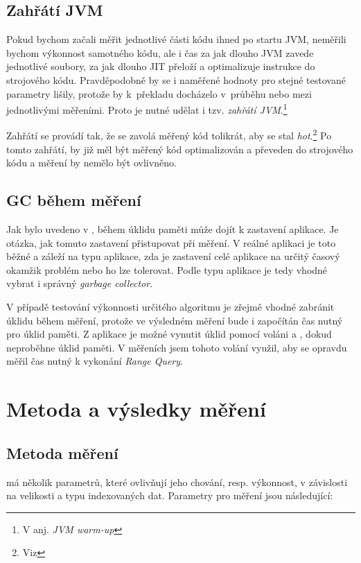 \subsection{Zahřátí JVM}

Pokud bychom začali měřit jednotlivé části kódu ihned po startu JVM, neměřili bychom výkonnost samotného kódu, ale i čas za jak dlouho JVM zavede jednotlivé \classfile soubory, za jak dlouho JIT přeloží a optimalizuje instrukce \bytecode{} do strojového kódu. Pravděpodobně by se i naměřené hodnoty pro stejné testované parametry lišily, protože by k~překladu docházelo v~průběhu nebo mezi jednotlivými měřeními. Proto je nutné udělat i tzv. \emph{zahřátí JVM}.\footnote{V anj. \emph{JVM warm-up}}

Zahřátí se provádí tak, že se zavolá měřený kód tolikrát, aby se stal \emph{hot}.\footnote{Viz } Po tomto zahřátí, by již měl být měřený kód optimalizován a převeden do strojového kódu a měření by nemělo být ovlivněno.

\subsection{GC během měření}
Jak bylo uvedeno v , během úklidu paměti může dojít k zastavení aplikace.
Je otázka, jak tomuto zastavení přistupovat při měření.
V reálné aplikaci je toto běžné a záleží na typu aplikace, zda je zastavení celé aplikace na určitý časový okamžik problém nebo ho lze tolerovat.
Podle typu aplikace je tedy vhodné vybrat i správný \emph{garbage collector}.

V případě testování výkonnosti určitého algoritmu je zřejmě vhodné zabránit úklidu během měření, protože ve výsledném měření bude i započítán čas nutný pro úklid paměti.
Z aplikace je možné vynutit úklid pomocí voláni  a , dokud neproběhne úklid paměti.
V měřeních jsem tohoto volání využil, aby se opravdu měřil čas nutný k vykonání \emph{Range Query}.

\section{Metoda a výsledky měření}
\subsection{Metoda měření}
\MIndex má několik parametrů, které ovlivňují jeho chování, resp. výkonnost, v závislosti na velikosti a typu indexovaných dat. Parametry pro měření jsou následující:

